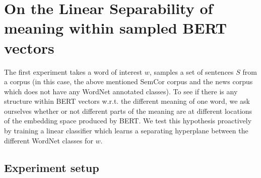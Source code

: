 \documentclass[a4paper,12pt,twoside,openright]{report}
\begin{document}
\section{On the Linear Separability of meaning within sampled BERT vectors}

The first experiment takes a word of interest $w$, samples a set of sentences $S$ from a corpus (in this case, the above mentioned SemCor corpus and the news corpus \cite{news_corpus} which does not have any WordNet annotated classes).
To see if there is any structure within BERT vectors w.r.t. the different meaning of one word, we ask ourselves whether or not different parts of the meaning are at different locations of the embedding space produced by BERT.
We test this hypothesis proactively by training a linear classifier which learns a separating hyperplane between the different WordNet classes for $w$.

\subsection{Experiment setup}
\end{document}
